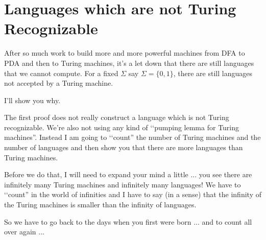 \section{Languages which are not Turing Recognizable}

After so much work to build more and more powerful machines from DFA to PDA and then to Turing machines,
it's a let down that there are still languages that we cannot compute.
For a fixed $\Sigma$ say $\Sigma = \{0, 1\}$, there are still languages
not accepted by a Turing machine.

I'll show you why.

The first proof does not really construct a language which is not 
Turing recognizable.
We're also not using any kind of \lq\lq pumping lemma for Turing machines''.
Instead I am going to \lq\lq count'' the number of Turing machines
and the number of languages and then show you that there are more languages
than Turing machines.

Before we do that, I will need to expand your mind a little ... you 
see there are infinitely many Turing machines and infinitely many
languages!
We have to \lq\lq count'' in the world of infinities and I have to say
(in a sense) that the infinity of the Turing machines is smaller than
the infinity of languages.

So we have to go back to the days when you first were born ...
and to count all over again ...

